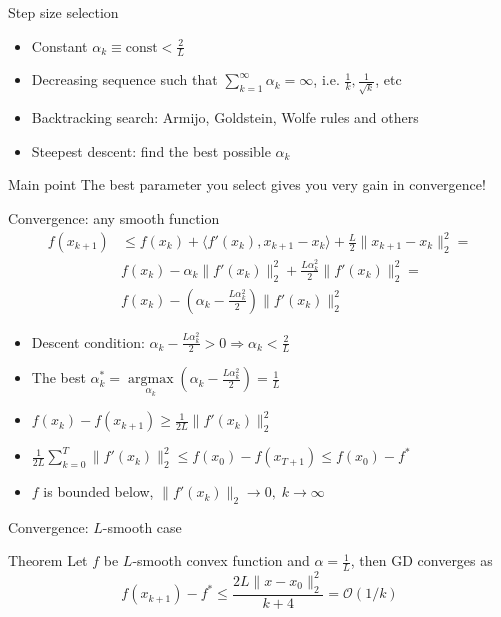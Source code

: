\documentclass{beamer}
\DeclareMathOperator*{\argmax}{\arg\max}
\begin{document}
\begin{frame}{Step size selection}

\begin{itemize}
\item Constant $\alpha_k \equiv \mathrm{const} < \frac{2}{L}$
\item Decreasing sequence such that $\sum\limits_{k=1}^{\infty} \alpha_k = \infty$, i.e. $\frac{1}{k}, \frac{1}{\sqrt{k}}$, etc
\item Backtracking search: Armijo, Goldstein, Wolfe rules and others
\item Steepest descent: find the best possible $\alpha_k$
\end{itemize}

\begin{block}{Main point}
The best parameter you select gives you very gain in convergence! 
\end{block}

\end{frame}

\begin{frame}{Convergence: any smooth function}
\begin{equation*}
\begin{split}
f(x_{k+1}) &\leq f(x_k) + \langle f'(x_k), x_{k+1} - x_k \rangle + \frac{L}{2}\|x_{k+1} - x_k\|_2^2 = \\
& f(x_k) - \alpha_k \|f'(x_k)\|_2^2 + \frac{L \alpha^2_k}{2} \|f'(x_k)\|_2^2 = \\
& f(x_k) - \left(\alpha_k - \frac{L\alpha_k^2}{2}\right)\|f'(x_k)\|_2^2
\end{split}
\end{equation*}
\begin{itemize}
\item Descent condition: $\alpha_k - \frac{L\alpha_k^2}{2} > 0 \Rightarrow \alpha_k < \frac{2}{L}$
\item  The best $\alpha^*_k = \argmax\limits_{\alpha_k}\left(\alpha_k - \frac{L\alpha_k^2}{2}\right) = \frac{1}{L}$
\item $f(x_k) - f(x_{k+1}) \geq \frac{1}{2L}\|f'(x_k)\|_2^2$
\item $\frac{1}{2L} \sum\limits_{k=0}^T \|f'(x_k)\|_2^2 \leq f(x_0) - f(x_{T+1}) \leq f(x_0) - f^*$
\item $f$ is bounded below, $\|f'(x_k)\|_2 \to 0, \; k \to \infty$
\end{itemize}
\end{frame}

\begin{frame}{Convergence: $L$-smooth case}
\begin{block}{Theorem}
Let $f$ be $L$-smooth convex function and $\alpha = \frac{1}{L}$, then GD converges as
\[
f(x_{k+1}) - f^* \leq \frac{2L\|x - x_0\|^2_2}{k+4} = \mathcal{O}(1 / k)
\]
\end{block}
\end{frame}
\end{document}

